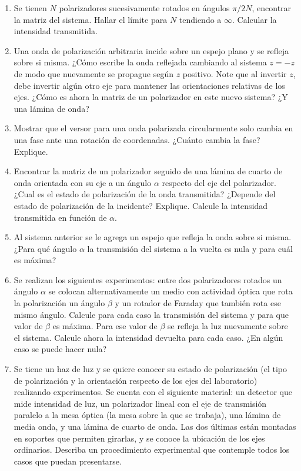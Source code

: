 \documentclass[11pt,spanish,a4paper]{article}
\begin{document}
\begin{enumerate}
\item Se tienen \(N\) polarizadores sucesivamente rotados en ángulos \(\pi/ 2N\), encontrar la matriz del sistema.
Hallar el límite para \(N\) tendiendo a \(\infty\).
Calcular la intensidad transmitida.


\item Una onda de polarización arbitraria incide sobre un espejo plano y se refleja sobre si misma.
¿Cómo escribe la onda reflejada cambiando al sistema \(z= -z\) de modo que nuevamente se propague según \(z\) positivo.
Note que al invertir \(z\), debe invertir algún otro eje para mantener las orientaciones relativas de los ejes.
¿Cómo es ahora la matriz de un polarizador en este nuevo sistema?
¿Y una lámina de onda?


\item Mostrar que el versor para una onda polarizada circularmente solo cambia en una fase ante una rotación de coordenadas.
¿Cuánto cambia la fase?
Explique.


\item Encontrar la matriz de un polarizador seguido de una lámina de cuarto de onda orientada con su eje a un ángulo \( \alpha \) respecto del eje del polarizador.
¿Cual es el estado de polarización de la onda transmitida?
¿Depende del estado de polarización de la incidente?
Explique.
Calcule la intensidad transmitida en función de \( \alpha \).


\item Al sistema anterior se le agrega un espejo que refleja la onda sobre si misma.
¿Para qué ángulo \( \alpha \) la transmisión del sistema a la vuelta es nula y para cuál es máxima?


\item Se realizan los siguientes experimentos: entre dos polarizadores rotados un ángulo \( \alpha \) se colocan alternativamente un medio con actividad óptica que rota la polarización un ángulo \( \beta \) y un rotador de Faraday que también rota ese mismo ángulo.
Calcule para cada caso la transmisión del sistema y para que valor de \( \beta \) es máxima.
Para ese valor de \( \beta \) se refleja la luz nuevamente sobre el sistema.
Calcule ahora la intensidad devuelta para cada caso.
¿En algún caso se puede hacer nula?


\item Se tiene un haz de luz y se quiere conocer su estado de polarización (el tipo de polarización y la orientación respecto de los ejes del laboratorio) realizando experimentos.
Se cuenta con el siguiente material: un detector que mide intensidad de luz, un polarizador lineal con el eje de transmisión paralelo a la mesa óptica (la mesa sobre la que se trabaja), una lámina de media onda, y una lámina de cuarto de onda.
Las dos últimas están montadas en soportes que permiten girarlas, y se conoce la ubicación de los ejes ordinarios.
Describa un procedimiento experimental que contemple todos los casos que puedan presentarse.



\end{enumerate}
\end{document}
